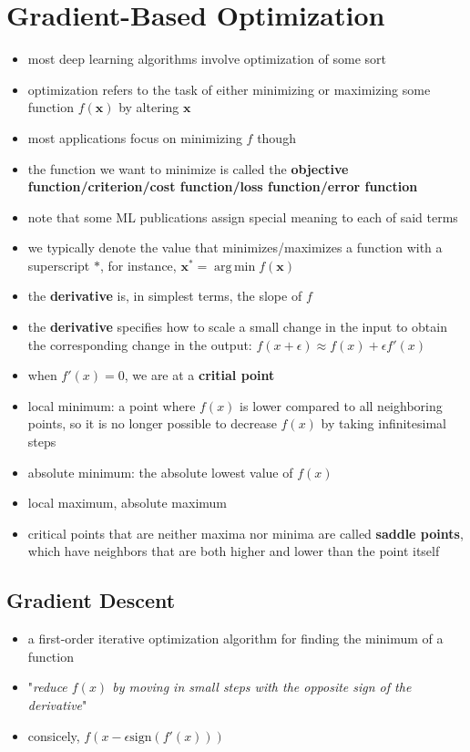 \documentclass[11pt, twocolumn]{report}
\DeclareMathOperator*{\argmin}{arg\,min}
\begin{document}
\section{Gradient-Based Optimization}
\begin{itemize}
  \item most deep learning algorithms involve optimization of some sort
  \item optimization refers to the task of either minimizing or maximizing
    some function $f(\bm{x})$ by altering $\bm{x}$
  \item most applications focus on minimizing $f$ though
  \item the function we want to minimize is called the \textbf{objective
      function/criterion/cost function/loss function/error function}
  \item note that some ML publications assign special meaning to each of said
    terms
  \item we typically denote the value that minimizes/maximizes a function with
    a superscript $*$, for instance, $\bm{x}^* = \argmin f(\bm{x})$
  \item the \textbf{derivative} is, in simplest terms, the slope of $f$
  \item the \textbf{derivative} specifies how to scale a small change in the
    input to obtain the corresponding change in the output: $f(x + \epsilon)
    \approx f(x) + \epsilon f'(x)$
  \item when $f'(x) = 0$, we are at a \textbf{critial point}
  \item local minimum: a point where $f(x)$ is lower compared to all
    neighboring points, so it is no longer possible to decrease $f(x)$ by taking
    infinitesimal steps
  \item absolute minimum: the absolute lowest value of $f(x)$
  \item local maximum, absolute maximum
  \item critical points that are neither maxima nor minima are called
    \textbf{saddle points}, which have neighbors that are both higher and lower
    than the point itself
\end{itemize}

\subsection{Gradient Descent}
\begin{itemize}
  \item a first-order iterative optimization algorithm for finding the minimum
    of a function
  \item "\textit{reduce $f(x)$ by moving in small steps with the opposite sign
      of the derivative}"
  \item consicely, $f(x - \epsilon \text{sign}(f'(x)))$
\end{itemize}
\end{document}

